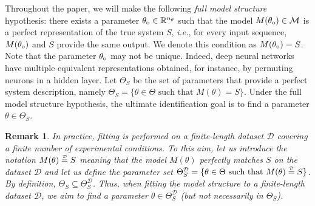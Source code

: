 \documentclass{article}
\newtheorem{remark}{Remark}{\normalfont}{\normalfont}
\newcommand{\thetao}{{\theta_{\rm o}}}
\newcommand{\So}{{S}}            %
\newcommand{\M}{{M}}             %
\newcommand{\MS}{\mathcal{M}}    %
\newcommand{\D}{{\mathcal{D}}}
\newcommand{\myeq}[1]{\mathrel{\overset{\makebox[0pt]{\mbox{\normalfont\tiny\sffamily $#1$}}}{=}}}
\newcommand{\ntheta}{n_\theta}
\newcommand{\Did}{{\mathcal{D}}}
\begin{document}


 Throughout the paper, we will make  the following \emph{full model structure} hypothesis:  there exists a parameter $\thetao \in \mathbb{R}^{\ntheta}$ such that the model $\M(\thetao) \in \MS$ is a perfect representation of the true system $\So$, \emph{i.e.},  for every  input sequence,  $\M(\thetao)$ and $\So$ provide the same output. We denote this condition as  $\M(\thetao) = \So$. Note that the parameter $\thetao$ may not be unique. Indeed, deep neural networks  have multiple equivalent representations obtained, for instance, by permuting neurons in a hidden layer. Let  $\Theta_\So$ be the set of parameters that provide a perfect system description, namely $\Theta_\So = \{\theta \in \Theta \text{ such that } \M(\theta) = \So\}$.  Under the full model structure hypothesis, the ultimate identification goal is to find a parameter $\theta \in \Theta_\So$. \\


\begin{remark}
In practice, fitting is performed on a finite-length dataset $\Did$ covering a finite number of experimental conditions. To this aim, let us introduce the notation $\M(\theta) \myeq{\D} \So$ meaning that 
the model $\M(\theta)$ perfectly matches $\So$ on the dataset $\D$ and    let  us define the parameter set  $\Theta_\So^\D = \{\theta \in \Theta \text{ such that } \M(\theta) \myeq{\D} \So\}$. By definition,   $\Theta_\So \subseteq \Theta_\So^\D$.  Thus, when fitting the model structure to a finite-length dataset $\Did$, we aim to find a parameter $\theta \in \Theta_\So^{\Did}$ (but not necessarily in $\Theta_{\So}$).
\end{remark}
\end{document}
